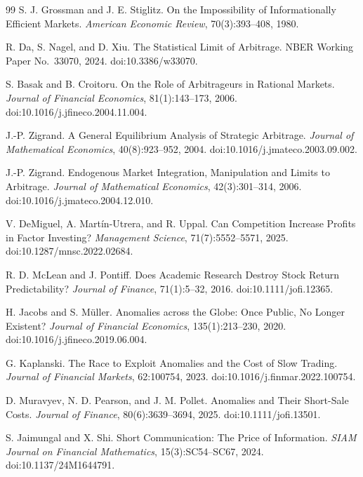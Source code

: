 \documentclass[11pt]{article}
\numberwithin{equation}{section}
\theoremstyle{plain}
\theoremstyle{definition}
\theoremstyle{remark}
\begin{document}
\begin{thebibliography}{99}
S. J. Grossman and J. E. Stiglitz.
\newblock On the Impossibility of Informationally Efficient Markets.
\newblock \emph{American Economic Review}, 70(3):393--408, 1980.

R. Da, S. Nagel, and D. Xiu.
\newblock The Statistical Limit of Arbitrage.
\newblock NBER Working Paper No.~33070, 2024.
\newblock doi:10.3386/w33070.

S. Basak and B. Croitoru.
\newblock On the Role of Arbitrageurs in Rational Markets.
\newblock \emph{Journal of Financial Economics}, 81(1):143--173, 2006.
\newblock doi:10.1016/j.jfineco.2004.11.004.

J.-P. Zigrand.
\newblock A General Equilibrium Analysis of Strategic Arbitrage.
\newblock \emph{Journal of Mathematical Economics}, 40(8):923--952, 2004.
\newblock doi:10.1016/j.jmateco.2003.09.002.

J.-P. Zigrand.
\newblock Endogenous Market Integration, Manipulation and Limits to Arbitrage.
\newblock \emph{Journal of Mathematical Economics}, 42(3):301--314, 2006.
\newblock doi:10.1016/j.jmateco.2004.12.010.

V. DeMiguel, A. Mart\'in-Utrera, and R. Uppal.
\newblock Can Competition Increase Profits in Factor Investing?
\newblock \emph{Management Science}, 71(7):5552--5571, 2025.
\newblock doi:10.1287/mnsc.2022.02684.

R. D. McLean and J. Pontiff.
\newblock Does Academic Research Destroy Stock Return Predictability?
\newblock \emph{Journal of Finance}, 71(1):5--32, 2016.
\newblock doi:10.1111/jofi.12365.

H. Jacobs and S. M\"uller.
\newblock Anomalies across the Globe: Once Public, No Longer Existent?
\newblock \emph{Journal of Financial Economics}, 135(1):213--230, 2020.
\newblock doi:10.1016/j.jfineco.2019.06.004.

G. Kaplanski.
\newblock The Race to Exploit Anomalies and the Cost of Slow Trading.
\newblock \emph{Journal of Financial Markets}, 62:100754, 2023.
\newblock doi:10.1016/j.finmar.2022.100754.

D. Muravyev, N. D. Pearson, and J. M. Pollet.
\newblock Anomalies and Their Short-Sale Costs.
\newblock \emph{Journal of Finance}, 80(6):3639--3694, 2025.
\newblock doi:10.1111/jofi.13501.

S. Jaimungal and X. Shi.
\newblock Short Communication: The Price of Information.
\newblock \emph{SIAM Journal on Financial Mathematics}, 15(3):SC54--SC67, 2024.
\newblock doi:10.1137/24M1644791.


\end{thebibliography}
\end{document}
